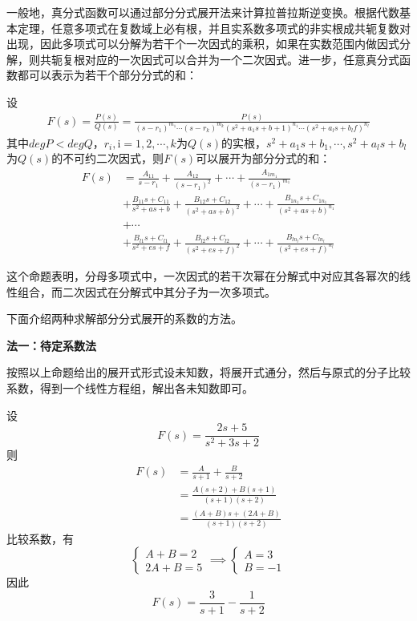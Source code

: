 一般地，真分式函数可以通过部分分式展开法来计算拉普拉斯逆变换。根据代数基本定理，任意多项式在复数域上必有根，并且实系数多项式的非实根成共轭复数对出现，因此多项式可以分解为若干个一次因式的乘积，如果在实数范围内做因式分解，则共轭复根对应的一次因式可以合并为一个二次因式。进一步，任意真分式函数都可以表示为若干个部分分式的和\cite{zorich}\cite{xinjiang}：
\begin{theorem}[部分分式展开定理]
    设\begin{align*}
    F(s)=\frac{P(s)}{Q(s)}=\frac{P(s)}{(s-r_1)^{m_1}\cdots (s-r_k)^{m_k}(s^2+a_1 s+b+1)^{n_1}\cdots (s^2+a_l s+b_l f)^{n_l}}
    \end{align*}
其中$degP<degQ$，$r_i,\mathrm{i}=1,2,\cdots,k$为$Q(s)$的实根，$s^2+a_1 s+b_1,\cdots,s^2+a_l s+b_l$为$Q(s)$的不可约二次因式，则$F(s)$可以展开为部分分式的和：
\begin{align*}
    F(s)&=\frac{A_{11}}{s-r_1}+\frac{A_{12}}{(s-r_1)^2}+\cdots +\frac{A_{1m_1}}{(s-r_1)^{m_1}}\\
    &+\frac{B_{11}s+C_{11}}{s^2+as+b}+\frac{B_{12}s+C_{12}}{(s^2+as+b)^2}+\cdots +\frac{B_{1n_1}s+C_{1n_1}}{(s^2+as+b)^{n_1}}\\
    &+\cdots \\
    &+\frac{B_{l1}s+C_{l1}}{s^2+es+f}+\frac{B_{l2}s+C_{l2}}{(s^2+es+f)^2}+\cdots +\frac{B_{ln_l}s+C_{ln_l}}{(s^2+es+f)^{n_l}}
\end{align*}
\end{theorem}
这个命题表明，分母多项式中，一次因式的若干次幂在分解式中对应其各幂次的线性组合，而二次因式在分解式中其分子为一次多项式。

下面介绍两种求解部分分式展开的系数的方法。

\noindent \textbf{法一：待定系数法}

按照以上命题给出的展开式形式设未知数，将展开式通分，然后与原式的分子比较系数，得到一个线性方程组，解出各未知数即可。
\begin{example}
    设\[F(s)=\frac{2s+5}{s^2+3s+2}\]
    则
    \begin{align*}
        F(s)&=\frac{A}{s+1}+\frac{B}{s+2}\\
        &=\frac{A(s+2)+B(s+1)}{(s+1)(s+2)}\\
        &=\frac{(A+B)s+(2A+B)}{(s+1)(s+2)}
    \end{align*}
    比较系数，有
    \[\begin{cases}
        A+B=2\\
        2A+B=5
    \end{cases}\implies \begin{cases}
        A=3\\
        B=-1
    \end{cases}\]
    因此\[F(s)=\frac{3}{s+1}-\frac{1}{s+2}\]
\end{example}

